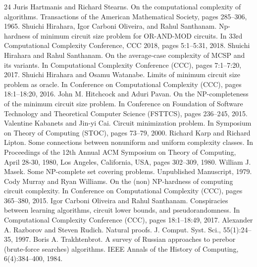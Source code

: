 \documentclass[10pt,a4paper]{article}
\begin{document}
\begin{thebibliography}{24}
Juris Hartmanis and Richard Stearns. On the computational complexity of algorithms. Transactions of the American Mathematical Society, pages 285–306, 1965.
Shuichi Hirahara, Igor Carboni Oliveira, and Rahul Santhanam. Np-hardness of minimum circuit size problem for OR-AND-MOD circuits. In 33rd Computational Complexity Conference, CCC 2018, pages 5:1–5:31, 2018.
Shuichi Hirahara and Rahul Santhanam. On the average-case complexity of MCSP and its variants. In Computational Complexity Conference (CCC), pages 7:1–7:20, 2017.
Shuichi Hirahara and Osamu Watanabe. Limits of minimum circuit size problem as oracle. In Conference on Computational Complexity (CCC), pages 18:1–18:20, 2016.
John M. Hitchcock and Aduri Pavan. On the NP-completeness of the minimum circuit size problem. In Conference on Foundation of Software Technology and Theoretical Computer Science (FSTTCS), pages 236–245, 2015.
Valentine Kabanets and Jin-yi Cai. Circuit minimization problem. In Symposium on Theory of Computing (STOC), pages 73–79, 2000.
Richard Karp and Richard Lipton. Some connections between nonuniform and uniform complexity classes. In Proceedings of the 12th Annual ACM Symposium on Theory of Computing, April 28-30, 1980, Los Angeles, California, USA, pages 302–309, 1980.
William J. Masek. Some NP-complete set covering problems. Unpublished Manuscript, 1979.
Cody Murray and Ryan Williams. On the (non) NP-hardness of computing circuit complexity. In Conference on Computational Complexity (CCC), pages 365–380, 2015.
Igor Carboni Oliveira and Rahul Santhanam. Conspiracies between learning algorithms, circuit lower bounds, and pseudorandomness. In Computational Complexity Conference (CCC), pages 18:1–18:49, 2017.
Alexander A. Razborov and Steven Rudich. Natural proofs. J. Comput. Syst. Sci., 55(1):24–35, 1997.
Boris A. Trakhtenbrot. A survey of Russian approaches to perebor (brute-force searches) algorithms. IEEE Annals of the History of Computing, 6(4):384–400, 1984.
\end{thebibliography}
\end{document}
